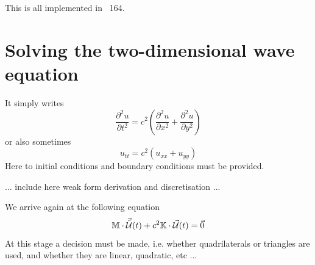 This is all implemented in \stone~164. 

\section{Solving the two-dimensional wave equation}




It simply writes
\[
\frac{\partial^2 u}{\partial t^2} = c^2 
\left( 
\frac{\partial^2 u}{\partial x^2} + 
\frac{\partial^2 u}{\partial y^2} 
\right)
\]
or also sometimes
\[
u_{tt} = c^2 (u_{xx} + u_{yy})
\]
Here to initial conditions and boundary conditions must be provided.


{\color{red} ... include here weak form derivation and discretisation ... }

We arrive again at the following equation
\begin{equation}
{\mathbb{M}} \cdot \vec{\ddot{{\cal U}}}(t) + c^2 {\mathbb{K}} \cdot \vec{\cal U}(t) = \vec{0}
\label{ss:waveq2d}
\end{equation}
At this stage a decision must be made, i.e. whether quadrilaterals or triangles 
are used, and whether they are linear, quadratic, etc ...




